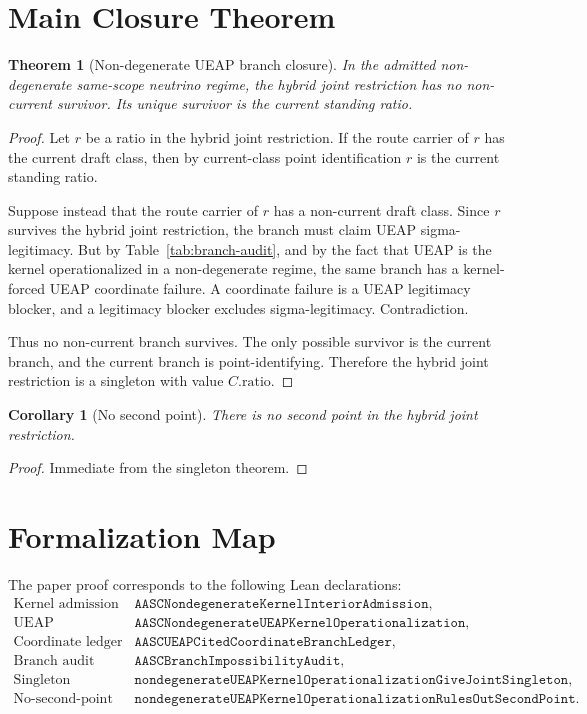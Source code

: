 \documentclass[11pt]{article}
\newtheorem{theorem}{Theorem}
\newtheorem{corollary}{Corollary}
\theoremstyle{definition}
\begin{document}
\section{Main Closure Theorem}

\begin{theorem}[Non-degenerate UEAP branch closure]
In the admitted non-degenerate same-scope neutrino regime, the hybrid joint
restriction has no non-current survivor. Its unique survivor is the current
standing ratio.
\end{theorem}

\begin{proof}
Let \(r\) be a ratio in the hybrid joint restriction. If the route carrier of
\(r\) has the current draft class, then by current-class point identification
\(r\) is the current standing ratio.

Suppose instead that the route carrier of \(r\) has a non-current draft class.
Since \(r\) survives the hybrid joint restriction, the branch must claim UEAP
sigma-legitimacy. But by Table~\ref{tab:branch-audit}, and by the fact that
UEAP is the kernel operationalized in a non-degenerate regime, the same branch
has a kernel-forced UEAP coordinate failure. A coordinate failure is a UEAP
legitimacy blocker, and a legitimacy blocker excludes sigma-legitimacy.
Contradiction.

Thus no non-current branch survives. The only possible survivor is the
current branch, and the current branch is point-identifying. Therefore the
hybrid joint restriction is a singleton with value \(C.\mathrm{ratio}\).
\end{proof}

\begin{corollary}[No second point]
There is no second point in the hybrid joint restriction.
\end{corollary}

\begin{proof}
Immediate from the singleton theorem.
\end{proof}

\section{Formalization Map}

The paper proof corresponds to the following Lean declarations:
\[
\begin{array}{ll}
\text{Kernel admission} &
\texttt{AASCNondegenerateKernelInteriorAdmission},\\
\text{UEAP operationalization} &
\texttt{AASCNondegenerateUEAPKernelOperationalization},\\
\text{Coordinate ledger} &
\texttt{AASCUEAPCitedCoordinateBranchLedger},\\
\text{Branch audit} &
\texttt{AASCBranchImpossibilityAudit},\\
\text{Singleton theorem} &
\texttt{nondegenerateUEAPKernelOperationalizationGiveJointSingleton},\\
\text{No-second-point theorem} &
\texttt{nondegenerateUEAPKernelOperationalizationRulesOutSecondPoint}.
\end{array}
\]
\end{document}
